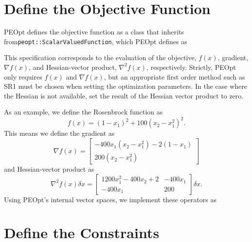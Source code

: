 \documentclass{report}
\begin{document}
\section{Define the Objective Function}

        PEOpt defines the objective function as a class that inherits from\linebreak\texttt{peopt::ScalarValuedFunction}, which PEOpt defines as

This specification corresponds to the evaluation of the objective, $f(x)$, gradient, $\nabla f(x)$, and Hessian-vector product, $\nabla^2 f(x)$, respectively.  Strictly, PEOpt only requires $f(x)$ and $\nabla f(x)$, but an appropriate first order method such as SR1 must be chosen when setting the optimization parameters.  In the case where the Hessian is not available, set the result of the Hessian vector product to zero. 

        As an example, we define the Rosenbrock function as
$$
        f(x)=(1-x_1)^2+100(x_2-x_1^2)^2.
$$
This means we define the gradient as
$$
        \nabla f(x)=\begin{bmatrix}
        -400x_1(x_2-x_1^2)-2(1-x_1)\\
        200(x_2-x_1^2)
        \end{bmatrix}
$$
and Hessian-vector product as
$$
        \nabla^2 f(x)\delta x=
        \begin{bmatrix}
            1200x_1^2-400x_2+2 & -400x_1\\
            -400x_1 & 200
        \end{bmatrix}\delta x.
$$
Using PEOpt's internal vector spaces, we implement these operators as


\section{Define the Constraints}
\end{document}
